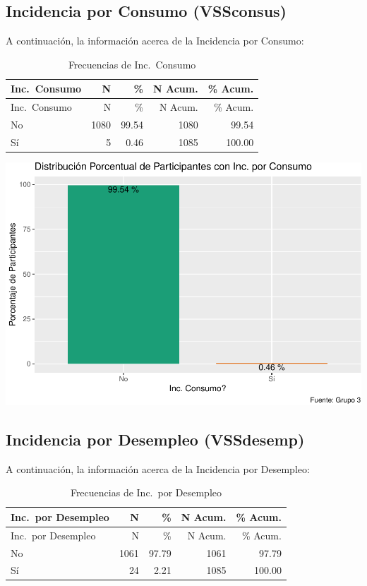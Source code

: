 \documentclass[
]{article}
\begin{document}
\subsection{Incidencia por Consumo
(VSSconsus)}\label{incidencia-por-consumo-vssconsus}

A continuación, la información acerca de la Incidencia por Consumo:

\begin{longtable}[]{@{}lrrrr@{}}
\caption{Frecuencias de Inc.~Consumo}\tabularnewline
\toprule\noalign{}
Inc.~Consumo & N & \% & N Acum. & \% Acum. \\
\midrule\noalign{}
\endfirsthead
\toprule\noalign{}
Inc.~Consumo & N & \% & N Acum. & \% Acum. \\
\midrule\noalign{}
\endhead
\bottomrule\noalign{}
\endlastfoot
No & 1080 & 99.54 & 1080 & 99.54 \\
Sí & 5 & 0.46 & 1085 & 100.00 \\
\end{longtable}

\includegraphics{Info_Dinix_02_files/figure-latex/30_VSSconsus-1.pdf}

\subsection{Incidencia por Desempleo
(VSSdesemp)}\label{incidencia-por-desempleo-vssdesemp}

A continuación, la información acerca de la Incidencia por Desempleo:

\begin{longtable}[]{@{}lrrrr@{}}
\caption{Frecuencias de Inc.~por Desempleo}\tabularnewline
\toprule\noalign{}
Inc.~por Desempleo & N & \% & N Acum. & \% Acum. \\
\midrule\noalign{}
\endfirsthead
\toprule\noalign{}
Inc.~por Desempleo & N & \% & N Acum. & \% Acum. \\
\midrule\noalign{}
\endhead
\bottomrule\noalign{}
\endlastfoot
No & 1061 & 97.79 & 1061 & 97.79 \\
Sí & 24 & 2.21 & 1085 & 100.00 \\
\end{longtable}
\end{document}

